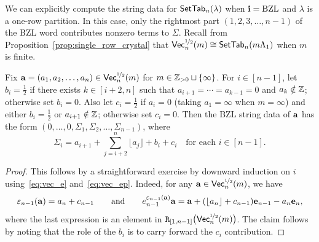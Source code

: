 \documentclass[11pt]{article}
\begin{document}
We can explicitly compute the string data for $\mathsf{SetTab}_n(\lambda)$ when $\mathbf{i} = \mathrm{BZL}$ and $\lambda$ is a one-row partition.
In this case, only the rightmost part $(1, 2, 3,\dotsc,  n-1)$ of the BZL word contributes nonzero terms to $\Sigma$.
Recall from Proposition~\ref{prop:single_row_crystal} that  $\mathsf{Vec}^{\nicefrac{1}{2}}_n(m) \cong \mathsf{SetTab}_n(m\Lambda_1)$ when $m$ is finite.


\begin{proposition}
Fix $\mathbf{a}=(a_1,a_2,\dots,a_n) \in \mathsf{Vec}^{\nicefrac{1}{2}}_n(m)$ for $m \in \mathbb{Z}_{>0} \sqcup \{\infty\}$.
For $i \in [n-1]$, let $b_i = \frac{1}{2}$ if there exists $k \in [i+2,n]$  such that $a_{i+1} = \cdots = a_{k-1} = 0$ and $a_k \notin \mathbb{Z}$; otherwise set $b_i = 0$.
Also let $c_i = \frac{1}{2}$ if  $a_i = 0$ (taking $a_1=\infty$ when $m = \infty$)
and either $b_i = \frac{1}{2}$ or $a_{i+1} \notin \mathbb{Z}$;
otherwise set $c_i = 0$.
Then the BZL string data of $\mathbf{a}$ has the form $(0, \dotsc, 0, \Sigma_1, \Sigma_2, \dotsc, \Sigma_{n-1})$, where
\[
\Sigma_i = a_{i+1} + \sum_{j=i+2}^n \lfloor a_j \rfloor + b_i + c_i 
\quad\text{for each }i \in[n-1].
\]
\end{proposition}

\begin{proof}
This follows by a straightforward exercise by downward induction on $i$  using~\eqref{eq:vec_e} and~\eqref{eq:vec_ep}.
Indeed, for any $\mathbf{a} \in \mathsf{Vec}^{\nicefrac{1}{2}}_n(m)$, we have
\[
\varepsilon_{n-1}(\mathbf{a}) =  a_{n}  + c_{n-1}
\qquad\text{and}\qquad
e_{n-1}^{\varepsilon_{n-1}(\mathbf{a})} \mathbf{a} = \mathbf{a} + (\lfloor a_{n} \rfloor + c_{n-1}) \textbf{e}_{n-1} - a_{n} \textbf{e}_{n},
\]
where the last expression is an element in $\mathtt{R}_{[1,n-1]}\bigl(\mathsf{Vec}^{\nicefrac{1}{2}}_n(m)\bigr)$.
The claim follows by noting that the role of the $b_i$ is to carry forward the $c_i$ contribution.
\end{proof}

\end{document}
